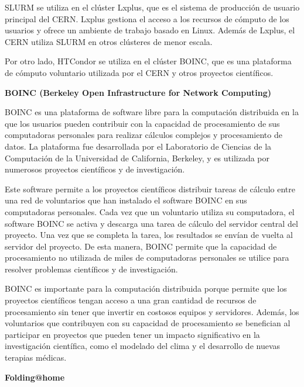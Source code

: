 \begin{spacing}{1.5}
  SLURM se utiliza en el clúster Lxplus, que es el sistema de producción de
  usuario principal del CERN. Lxplus gestiona el acceso a los recursos de cómputo
  de los usuarios y ofrece un ambiente de trabajo basado en Linux. Además de
  Lxplus, el CERN utiliza SLURM en otros clústeres de menor escala.

  Por otro lado, HTCondor se utiliza en el clúster BOINC, que es una plataforma
  de cómputo voluntario utilizada por el CERN y otros proyectos científicos.

  \textbf{BOINC (Berkeley Open Infrastructure for Network Computing)}

  BOINC es una plataforma de software libre para la computación distribuida en
  la que los usuarios pueden contribuir con la capacidad de procesamiento de sus
  computadoras personales para realizar cálculos complejos y procesamiento de
  datos. La plataforma fue desarrollada por el Laboratorio de Ciencias de la
  Computación de la Universidad de California, Berkeley, y es utilizada por
  numerosos proyectos científicos y de investigación.

  Este software permite a los proyectos científicos distribuir tareas de
  cálculo entre una red de voluntarios que han instalado el software BOINC en sus
  computadoras personales. Cada vez que un voluntario utiliza su computadora, el
  software BOINC se activa y descarga una tarea de cálculo del servidor central
  del proyecto. Una vez que se completa la tarea, los resultados se envían de
  vuelta al servidor del proyecto. De esta manera, BOINC permite que la capacidad
  de procesamiento no utilizada de miles de computadoras personales se utilice
  para resolver problemas científicos y de investigación.

  BOINC es importante para la computación distribuida porque permite que los
  proyectos científicos tengan acceso a una gran cantidad de recursos de
  procesamiento sin tener que invertir en costosos equipos y servidores. Además,
  los voluntarios que contribuyen con su capacidad de procesamiento se benefician
  al participar en proyectos que pueden tener un impacto significativo en la
  investigación científica, como el modelado del clima y el desarrollo de nuevas
  terapias médicas. \cite{BOINC-1}

  \textbf{Folding@home}


\end{spacing}

